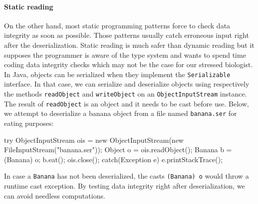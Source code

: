 \documentclass[a4paper]{report}
\newcommand{\icode}[1]{\colorbox{white}{\lstinline[language=code]&#1&}} %
\newcommand{\ijava}[1]{\colorbox{white}{\lstinline[language=code]&#1&}} %
\begin{document}
\paragraph{Static reading} On the other hand, most static programming patterns force to check data integrity as soon as possible. Those patterns usually catch erroneous input right after the deserialization. Static reading is much safer than dynamic reading but it supposes the programmer is aware of the type system and wants to spend time coding data integrity checks which may not be the case for our stressed biologist. In Java, objects can be serialized when they implement the \ijava{Serializable} interface. In that case, we can serialize and deserialize objects using respectively the methods \ijava{readObject} and \ijava{writeObject} on an \ijava{ObjectInputStream} instance. The result of \ijava{readObject} is an object and it needs to be cast before use. Below, we attempt to deserialize a banana object from a file named \icode{banana.ser} for eating purposes:
\begin{java}
try {
	ObjectInputStream ois = new ObjectInputStream(new FileInputStream("banana.ser"));
	Object o = ois.readObject();
	Banana b = (Banana) o;
	b.eat();
	ois.close();
} catch(Exception e) {
	e.printStackTrace();
}
\end{java}
In case a \ijava{Banana} has not been deserialized, the casts \ijava{(Banana) o} would throw a runtime cast exception. By testing data integrity right after deserialization, we can avoid needless computations.
\end{document}
